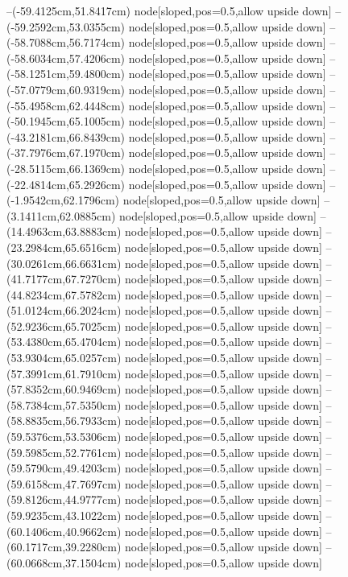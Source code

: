 --(-59.4125cm,51.8417cm) node[sloped,pos=0.5,allow upside down]{\ArrowIn}
--(-59.2592cm,53.0355cm) node[sloped,pos=0.5,allow upside down]{\ArrowIn}
--(-58.7088cm,56.7174cm) node[sloped,pos=0.5,allow upside down]{\ArrowIn}
--(-58.6034cm,57.4206cm) node[sloped,pos=0.5,allow upside down]{\arrowIn}
--(-58.1251cm,59.4800cm) node[sloped,pos=0.5,allow upside down]{\ArrowIn}
--(-57.0779cm,60.9319cm) node[sloped,pos=0.5,allow upside down]{\ArrowIn}
--(-55.4958cm,62.4448cm) node[sloped,pos=0.5,allow upside down]{\ArrowIn}
--(-50.1945cm,65.1005cm) node[sloped,pos=0.5,allow upside down]{\ArrowIn}
--(-43.2181cm,66.8439cm) node[sloped,pos=0.5,allow upside down]{\ArrowIn}
--(-37.7976cm,67.1970cm) node[sloped,pos=0.5,allow upside down]{\ArrowIn}
--(-28.5115cm,66.1369cm) node[sloped,pos=0.5,allow upside down]{\ArrowIn}
--(-22.4814cm,65.2926cm) node[sloped,pos=0.5,allow upside down]{\ArrowIn}
--(-1.9542cm,62.1796cm) node[sloped,pos=0.5,allow upside down]{\ArrowIn}
--(3.1411cm,62.0885cm) node[sloped,pos=0.5,allow upside down]{\ArrowIn}
--(14.4963cm,63.8883cm) node[sloped,pos=0.5,allow upside down]{\ArrowIn}
--(23.2984cm,65.6516cm) node[sloped,pos=0.5,allow upside down]{\ArrowIn}
--(30.0261cm,66.6631cm) node[sloped,pos=0.5,allow upside down]{\ArrowIn}
--(41.7177cm,67.7270cm) node[sloped,pos=0.5,allow upside down]{\ArrowIn}
--(44.8234cm,67.5782cm) node[sloped,pos=0.5,allow upside down]{\ArrowIn}
--(51.0124cm,66.2024cm) node[sloped,pos=0.5,allow upside down]{\ArrowIn}
--(52.9236cm,65.7025cm) node[sloped,pos=0.5,allow upside down]{\ArrowIn}
--(53.4380cm,65.4704cm) node[sloped,pos=0.5,allow upside down]{\arrowIn}
--(53.9304cm,65.0257cm) node[sloped,pos=0.5,allow upside down]{\arrowIn}
--(57.3991cm,61.7910cm) node[sloped,pos=0.5,allow upside down]{\ArrowIn}
--(57.8352cm,60.9469cm) node[sloped,pos=0.5,allow upside down]{\arrowIn}
--(58.7384cm,57.5350cm) node[sloped,pos=0.5,allow upside down]{\ArrowIn}
--(58.8835cm,56.7933cm) node[sloped,pos=0.5,allow upside down]{\arrowIn}
--(59.5376cm,53.5306cm) node[sloped,pos=0.5,allow upside down]{\ArrowIn}
--(59.5985cm,52.7761cm) node[sloped,pos=0.5,allow upside down]{\arrowIn}
--(59.5790cm,49.4203cm) node[sloped,pos=0.5,allow upside down]{\ArrowIn}
--(59.6158cm,47.7697cm) node[sloped,pos=0.5,allow upside down]{\ArrowIn}
--(59.8126cm,44.9777cm) node[sloped,pos=0.5,allow upside down]{\ArrowIn}
--(59.9235cm,43.1022cm) node[sloped,pos=0.5,allow upside down]{\ArrowIn}
--(60.1406cm,40.9662cm) node[sloped,pos=0.5,allow upside down]{\ArrowIn}
--(60.1717cm,39.2280cm) node[sloped,pos=0.5,allow upside down]{\ArrowIn}
--(60.0668cm,37.1504cm) node[sloped,pos=0.5,allow upside down]{\ArrowIn}
